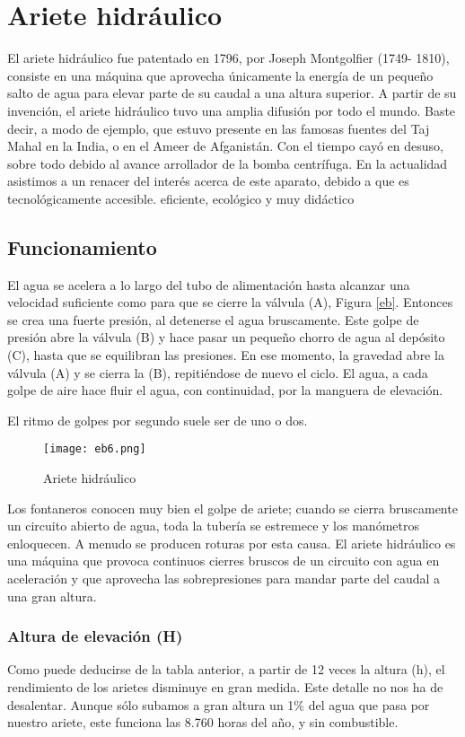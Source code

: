 \section{Ariete hidráulico}
El ariete hidráulico fue patentado en 1796, por Joseph Montgolfier (1749- 1810), consiste en una máquina que aprovecha únicamente la energía de un pequeño salto de agua para elevar parte de su caudal a una altura superior. A partir de su invención, el ariete hidráulico tuvo una amplia difusión por todo el mundo. Baste decir, a modo de ejemplo, que estuvo presente en las famosas fuentes del Taj Mahal en la India, o en el Ameer de Afganistán. Con el tiempo cayó en desuso, sobre todo debido al avance arrollador de la bomba centrífuga. En la actualidad asistimos a un renacer del interés acerca de este aparato, debido a que es tecnológicamente accesible. eficiente, ecológico y muy didáctico

\subsection{Funcionamiento}
El agua se acelera a lo largo del tubo de alimentación hasta alcanzar una velocidad suficiente como para que se cierre la válvula (A), Figura \ref{eb}. Entonces se crea una fuerte presión, al detenerse el agua bruscamente. Este golpe de presión abre la válvula (B) y hace pasar un pequeño chorro de agua al depósito (C), hasta que se equilibran las presiones. En ese momento, la gravedad abre la válvula (A) y se cierra la (B), repitiéndose de nuevo el ciclo. El agua, a cada golpe de aire hace fluir el agua, con continuidad, por la manguera de elevación.

El ritmo de golpes por segundo suele ser de uno o dos.
\begin{figure}[h!]
\centering
  \texttt{[image: eb6.png]}
  \caption{Ariete hidráulico}
  \label{eb6}
\end{figure}
Los fontaneros conocen muy bien el golpe de ariete; cuando se cierra bruscamente un circuito abierto de agua, toda la tubería se estremece y los manómetros enloquecen. A menudo se producen roturas por esta causa. El ariete hidráulico es una máquina que provoca continuos cierres bruscos de un circuito con agua en aceleración y que aprovecha las sobrepresiones para mandar parte del caudal a una gran altura.

\subsubsection{Altura de elevación (H)}
Como puede deducirse de la tabla anterior, a partir de 12 veces la altura (h), el rendimiento de los arietes disminuye en gran medida. Este detalle no nos ha de desalentar. Aunque sólo subamos a gran altura un 1\% del agua que pasa por nuestro ariete, este funciona las 8.760 horas del año, y sin combustible.


